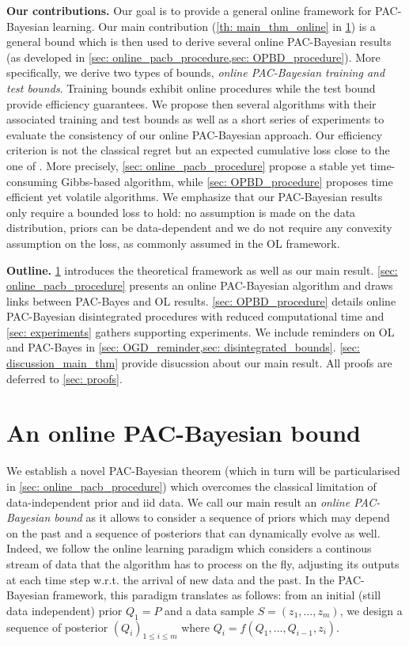 \textbf{Our contributions.} Our goal is to provide a general online framework for PAC-Bayesian learning. Our main contribution (\cref{th: main_thm_online} in \cref{sec: main_bound}) is a general bound  which is then used to derive several online PAC-Bayesian results (as developed in \cref{sec: online_pacb_procedure,sec: OPBD_procedure}).
More specifically, we derive two types of bounds, \emph{online PAC-Bayesian training and test bounds}.
Training bounds exhibit online procedures while the test bound provide efficiency guarantees. We propose then several algorithms with their associated training and test bounds as well as a short series of experiments to evaluate the consistency of our online PAC-Bayesian approach. Our efficiency criterion is not the classical regret but an expected cumulative loss close to the one of \citet{wintenberger2021stochastic}. More precisely, \cref{sec: online_pacb_procedure} propose a stable yet time-consuming Gibbs-based algorithm, while \cref{sec: OPBD_procedure} proposes time efficient yet volatile algorithms.
We emphasize that our PAC-Bayesian results only require a bounded loss to hold: no assumption is made on the data distribution, priors can be data-dependent and we do not require any convexity assumption on the loss, as commonly assumed in the OL framework.

\textbf{Outline.} \cref{sec: main_bound} introduces the  theoretical framework as well as our main result. \cref{sec: online_pacb_procedure} presents an online PAC-Bayesian algorithm and draws links between PAC-Bayes and OL results.
\cref{sec: OPBD_procedure} details online PAC-Bayesian disintegrated procedures with reduced computational time and \cref{sec: experiments} gathers supporting experiments.
We include reminders on OL and PAC-Bayes in \cref{sec: OGD_reminder,sec: disintegrated_bounds}. \cref{sec: discussion_main_thm} provide disucssion about our main result. All proofs are deferred to \cref{sec: proofs}.

\section{An online PAC-Bayesian bound}
\label{sec: main_bound}
We establish a novel PAC-Bayesian theorem (which in turn will be particularised in \cref{sec: online_pacb_procedure}) which overcomes the classical limitation of data-independent prior and iid data.
We call our main result an \emph{online PAC-Bayesian bound} as it allows to consider a sequence of priors which may depend on the past and a sequence of posteriors that can dynamically evolve as well. Indeed, we follow the online learning paradigm which considers a continous stream of data that the algorithm has to process on the fly, adjusting its outputs at each time step w.r.t. the arrival of new data and the past. In the PAC-Bayesian framework, this paradigm translates as follows: from an initial (still data independent) prior $Q_1=P$ and a data sample $S= (z_1,...,z_m)$, we design a sequence of posterior $(Q_i)_{1\leq i\leq m }$ where $Q_i= f(Q_1,...,Q_{i-1},z_i)$.

